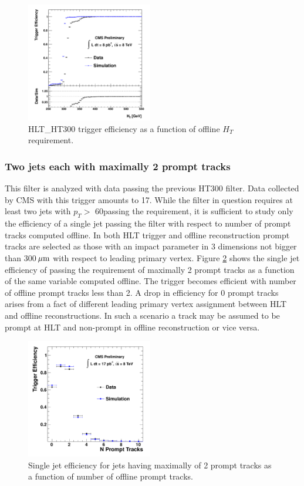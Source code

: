 \begin{figure}[htbp]
\centering
 \includegraphics[width=0.49\textwidth]{plots/trigger/effHT300.pdf}
\caption{HLT\_HT300 trigger efficiency as a function of offline $H_T$ requirement. \label{fig:effHT300}}
\end{figure} 

\subsubsection{Two jets each with maximally 2 prompt tracks}
\label{subsubsec:trig2Trks}

This filter is analyzed with data passing the previous 
HT300 filter. Data collected by CMS with this trigger amounts to 17\pbinv.  While the filter in question
 requires at least two jets with $p_T>$ 60\GeV passing the requirement, it is sufficient to study
 only the efficiency
 of a single jet passing the filter with respect to number of prompt tracks computed offline.
 In both HLT trigger and offline
 reconstruction prompt tracks are selected as those with an impact parameter in 3 dimensions 
not bigger than 300$\,\mu\text{m}$
 with respect to leading primary vertex. Figure \ref{fig:eff2Trks} shows the single jet efficiency of passing
 the requirement of maximally 2 prompt tracks as a function of the same variable computed offline.
 The trigger becomes efficient with number of offline prompt tracks less than 2. 
A drop in efficiency for 0 prompt tracks arises from a fact of different leading primary vertex assignment 
between HLT and offline reconstructions. 
In such a scenario a track may be assumed to be prompt at HLT and non-prompt
 in offline reconstruction or vice versa. 
  

\begin{figure}[htbp]
\centering
 \includegraphics[width=0.49\textwidth]{plots/trigger/effHT300_2Trk_NPromptTracks.pdf}
\caption{Single jet efficiency for jets having maximally of 2 prompt tracks as a function of number of offline prompt tracks. \label{fig:eff2Trks}}
\end{figure}

